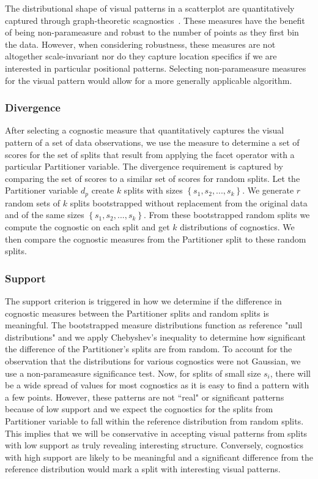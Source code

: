 The distributional shape of visual patterns in a scatterplot are quantitatively captured through graph-theoretic scagnostics~\cite{Wilkinson2005}. These measures have the benefit of being non-parameasure and robust to the number of points as they first bin the data. However, when considering robustness, these measures are not altogether scale-invariant nor do they capture location specifics if we are interested in particular positional patterns. Selecting non-parameasure measures for the visual pattern would allow for a more generally applicable algorithm. 

\subsubsection{Divergence}
After selecting a cognostic measure that quantitatively captures the visual pattern of a set of data observations, we use the measure to determine a set of scores for the set of splits that result from applying the facet operator with a particular Partitioner variable. The divergence requirement is captured by comparing the set of scores to a similar set of scores for random splits. Let the Partitioner variable $d_p$ create $k$ splits with sizes $\left\{ {s_1, s_2,...,s_k}\right\}$. We generate $r$ random sets of $k$ splits bootstrapped without replacement from the original data and of the same sizes $\left\{ {s_1, s_2,...,s_k}\right\}$. From these bootstrapped random splits we compute the cognostic on each split and get $k$ distributions of cognostics. We then compare the cognostic measures from the Partitioner split to these random splits.

\subsubsection{Support}
The support criterion is triggered in how we determine if the difference in cognostic measures between the Partitioner splits and random splits is meaningful. The bootstrapped measure distributions function as reference "null distributions" and we apply Chebyshev's inequality to determine how significant the difference of the Partitioner's splits are from random. To account for the observation that the distributions for various cognostics were not Gaussian, we use a non-parameasure significance test. Now, for splits of small size $s_i$, there will be a wide spread of values for most cognostics as it is easy to find a pattern with a few points. However, these patterns are not ``real" or significant patterns because of low support and we expect the cognostics for the splits from Partitioner variable to fall within the reference distribution from random splits. This implies that we will be conservative in accepting visual patterns from splits with low support as truly revealing interesting structure. Conversely, cognostics with high support are likely to be meaningful and a significant difference from the reference distribution would mark a split with interesting visual patterns.

